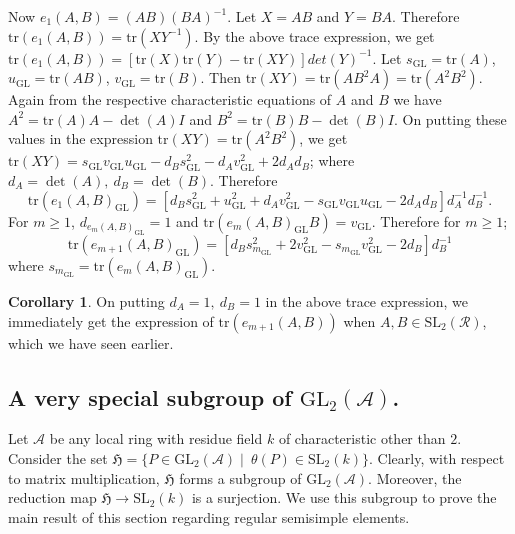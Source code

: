 \documentclass[10pt,twoside]{amsart}
\newcommand{\GL}{\mathrm{GL}}
\newcommand{\SL}{\mathrm{SL}}
\newcommand{\tr}{\mathrm{tr}}
\theoremstyle{definition}
\theoremstyle{definition}
\newtheorem{corollary}[theorem]{Corollary}
\begin{document}
Now $e_1(A,B)=(AB)(BA)^{-1}$. Let $X=AB$ and $Y=BA$. Therefore $\tr(e_1(A,B))=\tr(XY^{-1})$. By the above trace expression, we get $\tr(e_1(A,B))=[\tr(X)\tr(Y)-\tr(XY)]det(Y)^{-1}$. Let $s_{\GL}=\tr(A)$, $u_{\GL}=\tr(AB)$, $v_{\GL}=\tr(B)$. Then $\tr(XY)=\tr(AB^2A)=\tr(A^2B^2)$. Again from the respective characteristic equations of $A$ and $B$ we have $A^2=\tr(A)A-\det(A)I$ and $B^2=\tr(B)B-\det(B)I$. On putting these values in the expression $\tr(XY)=\tr(A^2B^2)$, we get $\tr(XY)=s_{\GL}v_{\GL}u_{\GL}-d_Bs_{\GL}^2-d_Av_{\GL}^2+2d_Ad_B$; where $d_A=\det(A),\ d_B=\det(B)$. Therefore $$\tr(e_1(A,B)_{\GL})=[d_Bs_{\GL}^2+u_{\GL}^2+d_Av_{\GL}^2-s_{\GL}v_{\GL}u_{\GL}-2d_Ad_B]d_A^{-1}d_B^{-1}.$$ For $m\geq 1$, $d_{e_m(A,B)_{\GL}}=1$ and $\tr(e_m(A,B)_{\GL}B)=v_{\GL}$. Therefore for $m\geq 1$;  $$ \tr(e_{m+1}(A,B)_{\GL})=[d_Bs_{m_{\GL}}^2+2v_{\GL}^2-s_{m_{\GL}}v_{\GL}^2-2d_B]d_B^{-1}$$
where $s_{m_{\GL}}=\tr(e_m(A,B)_{\GL})$.

\begin{corollary}
    On putting $d_A=1,\ d_B=1$ in the above trace expression, we immediately get the expression of $\tr(e_{m+1}(A,B))$ when $A,B\in \SL_2(\mathcal{R})$, which we have seen earlier. 
\end{corollary}
\fi

\iffalse
\subsection{A very special subgroup of $\GL_2(\mathcal{A})$.}{\label{trace in GL}} Let $\mathcal{A}$ be any local ring with residue field $k$ of characteristic other than $2$. Consider the set $\mathfrak{H}=\{P\in \GL_2(\mathcal{A})\mid\ \theta(P)\in \SL_2(k)\}$. Clearly, with respect to matrix multiplication, $\mathfrak{H}$ forms a subgroup of $\GL_2(\mathcal{A})$. Moreover, the reduction map $\mathfrak{H}\rightarrow \SL_2(k)$ is a surjection. We use this subgroup to prove the main result of this section regarding regular semisimple elements.
\end{document}
